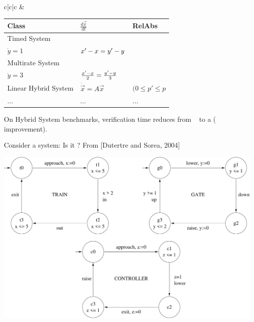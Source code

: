 \documentclass{seminar}
\begin{document}
\begin{slide}
\begin{tabular}{c|c|c}
&
\begin{minipage}{1.4in}
\small{
\begin{tabular}{|p{0.34in}|p{0.33in}|p{0.33in}|}
\hline
Class & $\frac{d\vec{x}}{dt}$ & RelAbs
\\
\hline \hline
\parbox{0.34in}{Timed System} & 
\parbox{0.34in}{$\dot{x}=1$,\\$\dot{y} = 1$} & 
\parbox{0.45in}{$x'-x=\\y'-y$}
\\
\hline
\parbox{0.34in}{Multirate System} & 
\parbox{0.34in}{$\dot{x}=2$,\\$\dot{y}=3$} & 
\parbox{0.33in}{$\frac{x'-x}{2} = \\ \frac{y'-y}{3}$}
\\
\hline
\parbox{0.34in}{Linear Hybrid System} & 
\parbox{0.36in}{$\dot{\vec{x}} = A\vec{x}$} & 
\parbox{0.33in}{$(0 \leq p'\leq p$}
\\
\hline
$\ldots$ & $\ldots$ & $\ldots$
\\
\hline
\end{tabular}

\bigskip

On Hybrid System benchmarks, verification time reduces from
~{} to a {} ({} improvement).
}
\end{minipage}
\end{tabular}

\end{slide}
\begin{slide}

Consider a {} system: Is it {}?
\hfill{\small{From [Dutertre and Sorea, 2004]}}

\includegraphics[angle=0,scale=0.38]{tgc}
\end{slide}
\end{document}
